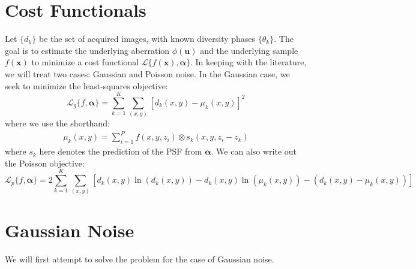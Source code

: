 \documentclass{article}
\begin{document}
\section{Cost Functionals}
Let $\{d_k\}$ be the set of acquired images, with known diversity phases $\{\theta_k\}$. The goal is to estimate the underlying aberration $\phi(\mathbf{u})$ and the underlying sample $f(\mathbf{x})$ to minimize a cost functional $\mathcal{L} \{f(\mathbf{x}), \bm{\alpha}\}$. In keeping with the literature, we will treat two cases: Gaussian and Poisson noise. In the Gaussian case, we seek to minimize the least-squares objective:
\begin{equation}
\mathcal{L}_g \{f, \bm{\alpha}\} = \sum_{k=1}^K \sum_{(x,y)} \left[d_k(x, y) - \mu_k(x,y) \right]^2
\label{eq:gaussian_cost_functional}
\end{equation}
where we use the shorthand:
\begin{align}
\mu_k(x, y) = \sum_{i=1}^P f(x, y, z_i) \otimes s_k(x, y, z_i - z_k)
\end{align}
where $s_k$ here denotes the prediction of the PSF from $\bm{\alpha}$. We can also write out the Poisson objective:
\begin{equation}
\mathcal{L}_p \{f, \bm{\alpha}\} = 2 \sum_{k=1}^K \sum_{(x,y)} \left[d_k(x, y) \ln(d_k(x,y)) - d_k(x,y) \ln(\mu_k(x,y)) - (d_k(x,y) - \mu_k(x,y))\right]
\end{equation}

\section{Gaussian Noise}
We will first attempt to solve the problem for the case of Gaussian noise.
\end{document}

